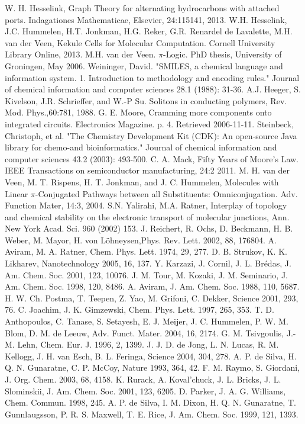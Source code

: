 \documentclass[12pt]{article}
\begin{document}
\begin{thebibliography}{abrv}

 W. H. Hesselink, Graph Theory for alternating hydrocarbons with attached ports. Indagationes Mathematicae, Elsevier, 24:115141, 2013.
 W.H. Hesselink, J.C. Hummelen, H.T. Jonkman, H.G. Reker, G.R. Renardel de Lavalette, M.H. van der Veen, Kekule Cells for Molecular Computation. Cornell University Library Online, 2013.
 M.H. van der Veen. $\pi$-Logic. PhD thesis, University of Groningen, May 2006.
 Weininger, David. "SMILES, a chemical language and information system. 1. Introduction to methodology and encoding rules." Journal of chemical information and computer sciences 28.1 (1988): 31-36.
 A.J. Heeger, S. Kivelson, J.R. Schrieffer, and W.-P Su. Solitons in conducting polymers, Rev. Mod. Phys.,60:781, 1988.
 G. E. Moore, Cramming more components onto integrated circuits. Electronics Magazine. p. 4. Retrieved 2006-11-11. 
 Steinbeck, Christoph, et al. "The Chemistry Development Kit (CDK): An open-source Java library for chemo-and bioinformatics." Journal of chemical information and computer sciences 43.2 (2003): 493-500.
 C. A. Mack, Fifty Years of Moore's Law. IEEE Transactions on semiconductor manufacturing, 24:2 2011.
 M. H. van der Veen, M. T. Rispens, H. T. Jonkman, and J. C. Hummelen, Molecules with Linear $\pi$-Conjugated Pathways between all Substituents: Omniconjugation. Adv. Function Mater, 14:3, 2004.
 S.N. Yalirahi, M.A. Ratner, Interplay of topology and chemical stability on the electronic transport of molecular junctions, Ann. New York Acad. Sci. 960 (2002) 153.
 J. Reichert, R. Ochs, D. Beckmann, H. B. Weber, M. Mayor, H. von Löhneysen,Phys. Rev. Lett. 2002, 88, 176804. 
 A. Aviram, M. A. Ratner, Chem. Phys. Lett. 1974, 29, 277.
 D. B. Strukov, K. K. Likharev, Nanotechnology 2005, 16, 137.
 Y. Karzazi, J. Cornil, J. L. Brédas, J. Am. Chem. Soc. 2001, 123, 10076.
 J. M. Tour, M. Kozaki, J. M. Seminario, J. Am. Chem. Soc. 1998, 120, 8486.
 A. Aviram, J. Am. Chem. Soc. 1988, 110, 5687.
 H. W. Ch. Postma, T. Teepen, Z. Yao, M. Grifoni, C. Dekker, Science 2001, 293, 76.
 C. Joachim, J. K. Gimzewski, Chem. Phys. Lett. 1997, 265, 353.
 T. D. Anthopoulos, C. Tanase, S. Setayesh, E. J. Meijer, J. C. Hummelen, P. W. M. Blom, D. M. de Leeuw, Adv. Funct. Mater. 2004, 16, 2174.
 G. M. Tsivgoulis, J.-M. Lehn, Chem. Eur. J. 1996, 2, 1399.
 J. J. D. de Jong, L. N. Lucas, R. M. Kellogg, J. H. van Esch, B. L. Feringa, Science 2004, 304, 278.
 A. P. de Silva, H. Q. N. Gunaratne, C. P. McCoy, Nature 1993, 364, 42.
 F. M. Raymo, S. Giordani, J. Org. Chem. 2003, 68, 4158.
 K. Rurack, A. Koval'chuck, J. L. Bricks, J. L. Slominskii, J. Am. Chem. Soc. 2001, 123, 6205.
 D. Parker, J. A. G. Williams, Chem. Commun. 1998, 245.
 A. P. de Silva, I. M. Dixon, H. Q. N. Gunaratne, T. Gunnlaugsson, P. R. S. Maxwell, T. E. Rice, J. Am. Chem. Soc. 1999, 121, 1393.


\end{thebibliography}
\end{document}

